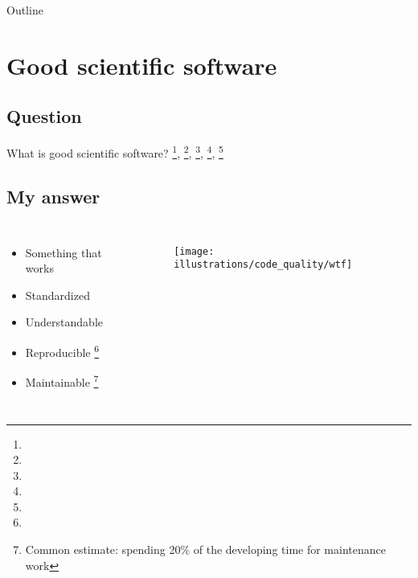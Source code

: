 \documentclass[usenames,dvipsnames]{beamer}
\theoremstyle{plain}
\theoremstyle{definition}
\begin{document}
\begin{frame}{Outline}
  \tableofcontents[hideallsubsections]
\end{frame}


\section{Good scientific software}
\subsection{Question}


\begin{frame}{\setframetitle{}}
  {
    \centering \Large What is good scientific software?
    \newline 
    \footnote{}, \footnote{}, \footnote{}, \footnote{}, \footnote{}
  }
\end{frame}



\subsection{My answer}



\begin{frame}{\setframetitle{}}
  {
    \begin{columns}[t]
      \begin{itemize}
      \item Something that works
      \item Standardized
      \item Understandable
      \item Reproducible \footnote{}
      \item
\renewcommand{\thefootnote}{\fnsymbol{footnote}}
Maintainable \footnote{Common estimate: spending 20\% of the developing time
        for maintenance work }
      \end{itemize}
 \begin{figure}
        \captionsetup[subfigure]{justification=centering}
        \centering
        \subcaptionbox{}
        {\texttt{[image: illustrations/code\_quality/wtf]}}
      \end{figure}
    \end{columns}
}

\end{frame}
\end{document}
